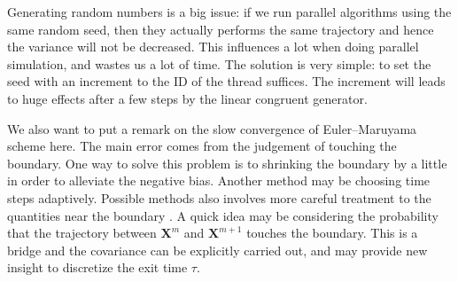 \documentclass[english, nochinese]{pnote}
\begin{document}
Generating random numbers is a big issue: if we run parallel algorithms using the same random seed, then they actually performs the same trajectory and hence the variance will not be decreased. This influences a lot when doing parallel simulation, and wastes us a lot of time. The solution is very simple: to set the seed with an increment to the ID of the thread suffices. The increment will leads to huge effects after a few steps by the linear congruent generator.

We also want to put a remark on the slow convergence of Euler--Maruyama scheme here. The main error comes from the judgement of touching the boundary. One way to solve this problem is to shrinking the boundary by a little in order to alleviate the negative bias. Another method may be choosing time steps adaptively. Possible methods also involves more careful treatment to the quantities near the boundary \parencite{yan_parallel_2013}. A quick idea may be considering the probability that the trajectory between $ \bm{X}^m $ and $ \bm{X}^{ m + 1 } $ touches the boundary. This is a bridge and the covariance can be explicitly carried out, and may provide new insight to discretize the exit time $\tau$.

\printbibliography
\end{document}
